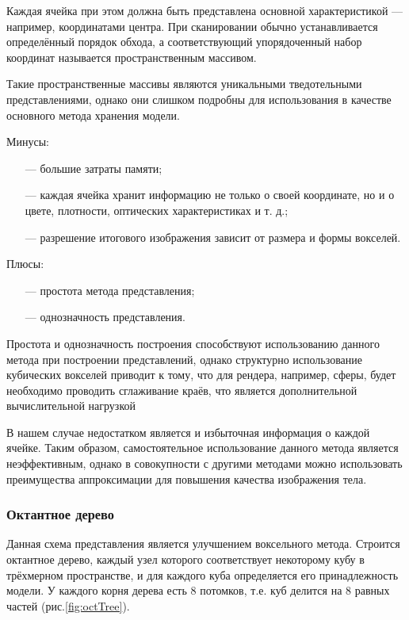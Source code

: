 Каждая ячейка при этом должна быть представлена основной 
характеристикой --- например, координатами центра.
При сканировании 
обычно устанавливается определённый порядок обхода, а соответствующий 
упорядоченный набор координат называется пространственным массивом.

Такие пространственные массивы являются уникальными тведотельными 
представлениями, однако они слишком подробны для использования в качестве 
основного метода хранения модели.

Минусы:
\begin{itemize}[leftmargin=1.6\parindent]
	\item[---] большие затраты памяти;
	\item[---] каждая ячейка хранит информацию не только о своей координате, но и о цвете, плотности, оптических характеристиках и т. д.;
	\item[---] разрешение итогового изображения зависит от размера и формы вокселей.
\end{itemize}

Плюсы:
\begin{itemize}[leftmargin=1.6\parindent]
	\item[---] простота метода представления;
	\item[---] однозначность представления.
\end{itemize}

Простота и однозначность построения способствуют использованию 
данного метода при построении представлений, однако структурно 
использование кубических вокселей приводит к тому, что для рендера, например, сферы, будет необходимо проводить сглаживание краёв, что 
является дополнительной вычислительной нагрузкой

В нашем случае недостатком является и избыточная информация о 
каждой ячейке.
Таким образом, самостоятельное использование данного метода 
является неэффективным, однако в совокупности с другими методами можно 
использовать преимущества аппроксимации для повышения качества 
изображения тела.

\subsubsection{Октантное дерево}

Данная схема представления является улучшением воксельного метода. 
Строится октантное дерево, каждый узел которого соответствует некоторому 
кубу в трёхмерном пространстве, и для каждого куба определяется его 
принадлежность модели.
У каждого корня дерева есть 8 потомков, т.е. куб 
делится на 8 равных частей (рис.\ref{fig:octTree}).
\newpage

